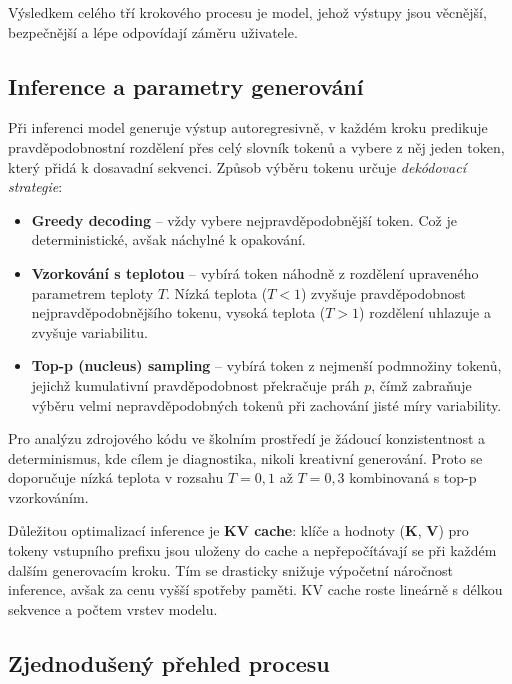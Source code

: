 Výsledkem celého tří krokového procesu je model, jehož výstupy jsou věcnější, bezpečnější a lépe odpovídají záměru uživatele.

\subsection{Inference a parametry generování}
\label{subsec:inference-generation}

Při inferenci model generuje výstup autoregresivně, v každém kroku predikuje pravděpodobnostní rozdělení přes celý slovník tokenů a vybere z něj jeden token, který přidá k dosavadní sekvenci.
Způsob výběru tokenu určuje \textit{dekódovací strategie}:

\begin{itemize}
    \item \textbf{Greedy decoding} -- vždy vybere nejpravděpodobnější token.
    Což je deterministické, avšak náchylné k opakování.

    \item \textbf{Vzorkování s teplotou} -- vybírá token náhodně z rozdělení upraveného parametrem teploty $T$.
    Nízká teplota ($T < 1$) zvyšuje pravděpodobnost nejpravděpodobnějšího tokenu, vysoká teplota ($T > 1$) rozdělení uhlazuje a zvyšuje variabilitu.

    \item \textbf{Top-p (nucleus) sampling} -- vybírá token z nejmenší podmnožiny tokenů, jejichž kumulativní pravděpodobnost překračuje práh $p$, čímž zabraňuje výběru velmi nepravděpodobných tokenů při zachování jisté míry variability.
\end{itemize}

Pro analýzu zdrojového kódu ve školním prostředí je žádoucí konzistentnost a determinismus, kde cílem je diagnostika, nikoli kreativní generování.
Proto se doporučuje nízká teplota v rozsahu $T = 0{,}1$ až $T = 0{,}3$ kombinovaná s top-p vzorkováním.

Důležitou optimalizací inference je \textbf{KV cache}: klíče a hodnoty ($\mathbf{K}$, $\mathbf{V}$) pro tokeny vstupního prefixu jsou uloženy do cache a nepřepočítávají se při každém dalším generovacím kroku.
Tím se drasticky snižuje výpočetní náročnost inference, avšak za cenu vyšší spotřeby paměti.
KV cache roste lineárně s délkou sekvence a počtem vrstev modelu.

\subsection*{Zjednodušený přehled procesu}
\label{subsec:llm-simplified-process}

